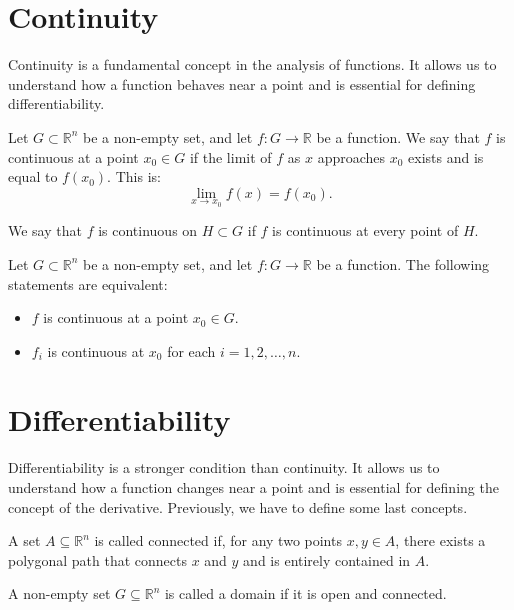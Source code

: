 \section{Continuity}

Continuity is a fundamental concept in the analysis of functions. It allows us to understand how a function behaves near a point and is essential for defining differentiability.
\begin{definicion}[Continuity]
    Let $G\subset \mathbb{R}^n$ be a non-empty set, and let $f : G \to \mathbb{R}$ be a function. We say that $f$ is continuous at a point $x_0 \in G$ if the limit of $f$ as $x$ approaches $x_0$ exists and is equal to $f(x_0)$. This is:
    \[
        \lim_{x \to x_0} f(x) = f(x_0).
    \]

    We say that $f$ is continuous on $H\subset G$ if $f$ is continuous at every point of $H$.
\end{definicion}
\begin{prop}
    Let $G\subset \mathbb{R}^n$ be a non-empty set, and let $f : G \to \mathbb{R}$ be a function. The following statements are equivalent:
    \begin{itemize}
        \item $f$ is continuous at a point $x_0 \in G$.
        \item $f_i$ is continuous at $x_0$ for each $i = 1, 2, \dots, n$.
    \end{itemize}
\end{prop}

\section{Differentiability}

Differentiability is a stronger condition than continuity. It allows us to understand how a function changes near a point and is essential for defining the concept of the derivative. Previously, we have to define some last concepts.
\begin{definicion}
    A set $A \subseteq \mathbb{R}^n$ is called connected if, for any two points $x, y \in A$, there exists a polygonal path that connects $x$ and $y$ and is entirely contained in $A$.
\end{definicion}
\begin{definicion}[Domain]
    A non-empty set $G \subseteq \mathbb{R}^n$ is called a domain if it is open and connected.
\end{definicion}

